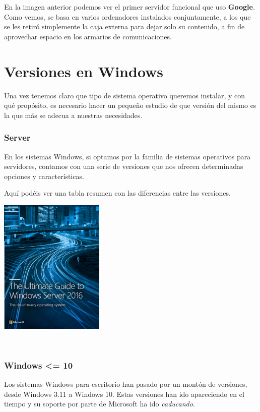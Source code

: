 \documentclass[11pt]{article}
\begin{document}
En la imagen anterior podemos ver el primer servidor funcional que uso
\textbf{Google}. Como vemos, se basa en varios ordenadores instalados
conjuntamente, a los que se les retiró simplemente la caja externa para
dejar solo su contenido, a fin de aprovechar espacio en los armarios de
comunicaciones.


\section{Versiones en Windows}
\label{sec:org227f03a}
Una vez tenemos claro que tipo de sistema operativo queremos instalar, y
con qué propósito, es necesario hacer un pequeño estudio de que versión
del mismo es la que más se adecua a nuestras necesidades.

\subsubsection{Server}
\label{sec:org7e6198a}
En los sistemas Windows, si optamos por la familia de sistemas
operativos para servidores, contamos con una serie de versiones que nos
ofrecen determinadas opciones y características.

Aquí podéis ver una tabla resumen con las diferencias entre las
versiones.

\begin{center}
\includegraphics[width=5cm]{Versiones/WindowsServer_cover.png}
\end{center}  

\subsubsection{Windows <= 10}
\label{sec:orgf2da419}
Los sistemas Windows para escritorio han pasado por un montón de
versiones, desde Windows 3.11 a Windows 10. Estas versiones han ido
apareciendo en el tiempo y su soporte por parte de Microsoft ha ido
\emph{caducando}.
\end{document}
